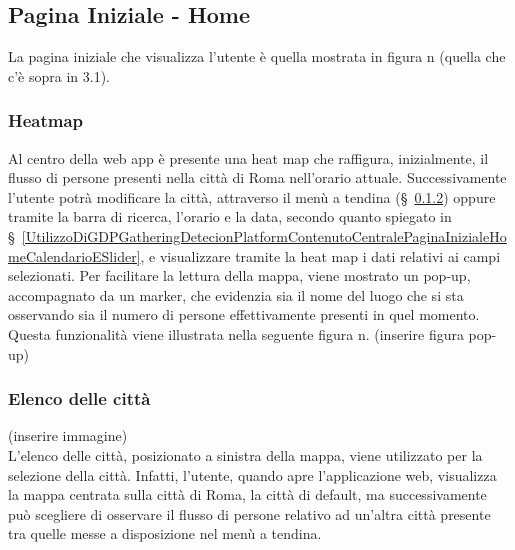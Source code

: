 \subsection{Pagina Iniziale - Home} \label{UtilizzoDiGDPGatheringDetecionPlatformContenutoCentralePaginaInizialeHome}
La pagina iniziale che visualizza l'utente è quella mostrata in figura n (quella che c'è sopra in 3.1). 
\subsubsection{Heatmap}\label{UtilizzoDiGDPGatheringDetecionPlatformContenutoCentralePaginaInizialeHomeHeatmap}
Al centro della web app è presente una heat map che raffigura, inizialmente, il flusso di persone presenti nella città di Roma nell'orario attuale. Successivamente l'utente potrà modificare la città, attraverso il menù a tendina (\S~\ref{UtilizzoDiGDPGatheringDetecionPlatformContenutoCentralePaginaInizialeHomeMenùATendina}) oppure tramite la barra di ricerca, l'orario e la data, secondo quanto spiegato in \S~\ref{UtilizzoDiGDPGatheringDetecionPlatformContenutoCentralePaginaInizialeHomeCalendarioESlider}, e visualizzare tramite la heat map i dati relativi ai campi selezionati. Per facilitare la lettura della mappa, viene mostrato un pop-up, accompagnato da un marker, che evidenzia sia il nome del luogo che si sta osservando sia il numero di persone effettivamente presenti in quel momento. Questa funzionalità viene illustrata nella seguente figura n. (inserire figura pop-up)
\subsubsection{Elenco delle città} \label{UtilizzoDiGDPGatheringDetecionPlatformContenutoCentralePaginaInizialeHomeMenùATendina}
(inserire immagine) \\
L'elenco delle città, posizionato a sinistra della mappa, viene utilizzato per la selezione della città. Infatti, l'utente, quando apre l'applicazione web, visualizza la mappa centrata sulla città di Roma, la città di default, ma successivamente può scegliere di osservare il flusso di persone relativo ad un'altra città presente tra quelle messe a disposizione nel menù a tendina. 

